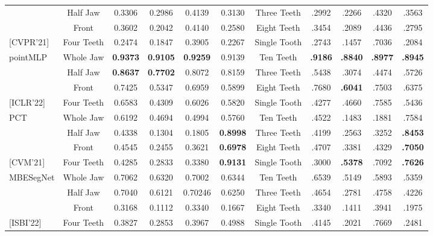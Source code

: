 \documentclass[letterpaper, 10 pt, conference]{ieeeconf}  %
\begin{document}
\begin{table*}[htbp]
\begin{tabular}{|l|c|c|c|c | c | c | c | c | c | c |}
& Half Jaw & 0.3306 & 0.2986 & 0.4139 & 0.3130 & Three Teeth  & .2992 & .2266 & .4320 & .3563\\
& Front & 0.3602 & 0.2042 & 0.4140 & 0.2580 & Eight Teeth & .3454 & .2089 & .4436 & .2795\\
{ [CVPR'21]}& Four Teeth & 0.2474 & 0.1847 & 0.3905 & 0.2267 & Single Tooth & .2743 & .1457 & .7036 & .2084 \\
\hline
{pointMLP} & Whole Jaw & \bf{0.9373} & \bf{0.9105} & \bf{0.9259} & 0.9139 & Ten Teeth & \bf{.9186} & \bf{.8840}& \bf{.8977} & \bf{.8945}\\
& Half Jaw & \bf{0.8637} & \bf{0.7702} & 0.8072 & 0.8159 & Three Teeth  & .5438 & .3074 & .4474 & .5726\\
& Front & 0.7425 & 0.5347 & 0.6959 & 0.5899 & Eight Teeth & .7680 & \bf{.6041} & .7503 & .6375\\
{[ICLR'22]}& Four Teeth & 0.6583 & 0.4309 & 0.6026 & 0.5820 & Single Tooth & .4277 & .4660 & .7585 & .5436 \\
\hline
{PCT} & Whole Jaw & 0.6192 & 0.4694 & 0.4994 & 0.5760  & Ten Teeth &  .4522 &  .1483 & .1881 & .7584\\
& Half Jaw & 0.4338 & 0.1304 & 0.1805 & \bf{0.8998}  & Three Teeth  & .4199 &  .2563 & .3252 & \bf{.8453}\\
& Front & 0.4545 & 0.2455 & 0.3621 & \bf{0.6978} & Eight Teeth & .4707 & .3381 & .4329 & \bf{.7050}\\
 {[CVM'21]} & Four Teeth & 0.4285 & 0.2833 & 0.3380 & \bf{0.9131} & Single Tooth & .3000 & \bf{.5378} & .7092 & \bf{.7626} \\
\hline
{MBESegNet} & Whole Jaw & 0.7062 & 0.6320 & 0.7002 & 0.6344  & Ten Teeth & .6539 & .5149 &  .5893 & .5359\\
& Half Jaw & 0.7040 & 0.6121 & 0.70246 & 0.6250 & Three Teeth  & .4654 & .2781 & .4758 & .4226\\
& Front & 0.3168 & 0.1112 & 0.3340 & 0.1667 & Eight Teeth & .3340 & .1411 & .3941 & .1975\\
{ [ISBI'22]} & Four Teeth & 0.3827 & 0.2853 & 0.3967 & 0.4988 & Single Tooth & .4145 & .2021 & .7669 & .2481 \\
\hline
\end{tabular}
\label{tab:allres}
\end{table*}
\end{document}
